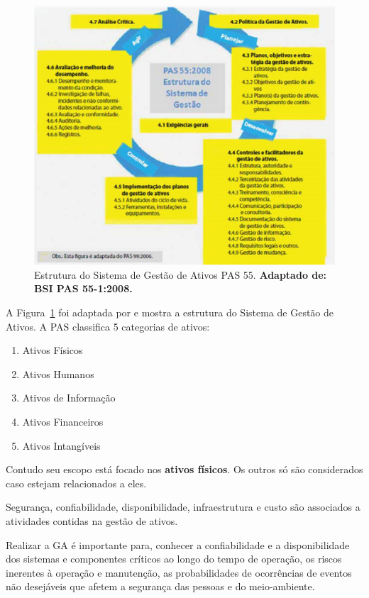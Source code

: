 \graphicspath{{figuras/}}
\begin{figure}[H]
\centering
\includegraphics[width=1.0\textwidth]{pas55}
\caption{Estrutura do Sistema de Gestão de Ativos PAS 55. \textbf{Adaptado de: BSI PAS 55-1:2008.}}
\label{estrutura_pas_55}
\end{figure}

A Figura~\ref{estrutura_pas_55} foi adaptada por \cite{valeria2013} e mostra a estrutura do Sistema de Gestão de Ativos. A PAS classifica 5 categorias de ativos:

\begin{enumerate}
	\item{Ativos Físicos}
	\item{Ativos Humanos}
	\item{Ativos de Informação}
	\item{Ativos Financeiros}
	\item{Ativos Intangíveis}
\end{enumerate}

Contudo seu escopo está focado nos \textbf{ativos físicos}. Os outros só são considerados caso estejam relacionados a eles.

Segurança, confiabilidade, disponibilidade, infraestrutura e custo são associados a atividades contidas na gestão de ativos. 

Realizar a GA é importante para, conhecer a confiabilidade e a disponibilidade dos sistemas e componentes críticos ao longo do tempo de operação, os riscos inerentes à operação e manutenção, as probabilidades de ocorrências de eventos não desejáveis que afetem a segurança das pessoas e do meio-ambiente.


